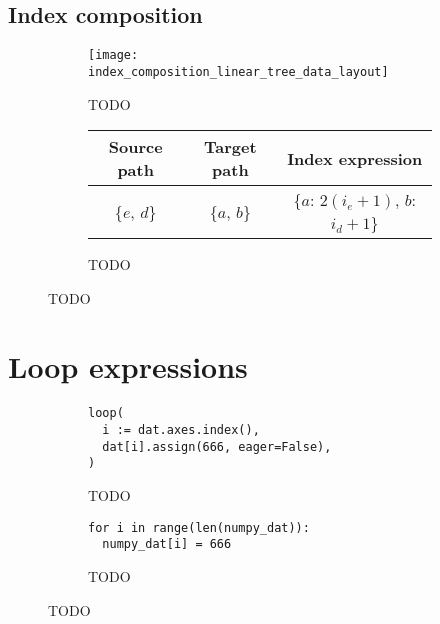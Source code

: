 \documentclass[thesis]{subfiles}
\begin{document}
\subsection{Index composition}
\label{sec:index_composition}

\begin{figure}
  \centering
  \begin{subfigure}{\textwidth}
    \centering
    \texttt{[image: index\_composition\_linear\_tree\_data\_layout]}
    \caption{TODO}
    \label{fig:index_composition_linear_tree_data_layout}
  \end{subfigure}

  \vspace{1em}

  \begin{subfigure}{\textwidth}
    \centering
    \begin{tabular}{c|c|c}
      \textbf{Source path} & \textbf{Target path} & \textbf{Index expression} \\
      \hline
      \{$e$, $d$\} & \{$a$, $b$\} & \{$a$: $2 (i_e+1)$, $b$: $i_d+1$\} \\
    \end{tabular}
    \caption{TODO}
    \label{fig:index_composition_linear_tree_exprs}
  \end{subfigure}

  \caption{TODO}
  \label{fig:index_composition_linear_tree_all}
\end{figure}

\section{Loop expressions}

\begin{figure}[h]
  \centering
  \begin{subfigure}{.48\textwidth}
    \centering
    \begin{verbatim}
loop(
  i := dat.axes.index(),
  dat[i].assign(666, eager=False),
)
    \end{verbatim}
    \caption{TODO}
    \label{fig:simple_loop_pyop3}
  \end{subfigure}
  \begin{subfigure}{.48\textwidth}
    \centering
    \begin{verbatim}
for i in range(len(numpy_dat)):
  numpy_dat[i] = 666
    \end{verbatim}
    \caption{TODO}
    \label{fig:simple_loop_python}
  \end{subfigure}

  \caption{TODO}
  \label{fig:simple_loop}
\end{figure}
\end{document}
